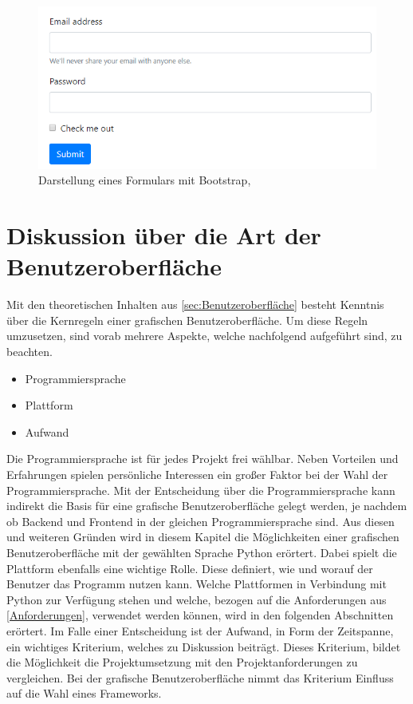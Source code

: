 \documentclass[a4paper,titlepage,halfparskip,12pt]{scrreprt}
\begin{document}
\begin{onehalfspacing}
\begin{figure}[h]
	\centering
	\includegraphics[scale=1.0]{images/BootstrapForm}
	\caption{Darstellung eines Formulars mit Bootstrap, \cite{bootstrapOnline}} 
	\label{img:BootstrapForm}
\end{figure}
\pagebreak

\chapter{Diskussion über die Art der Benutzeroberfläche}
\label{chap:DiskussionGUI}

Mit den theoretischen Inhalten aus \autoref{sec:Benutzeroberfläche} besteht Kenntnis über die Kernregeln einer grafischen Benutzeroberfläche. Um diese Regeln umzusetzen, sind vorab mehrere Aspekte, welche nachfolgend aufgeführt sind, zu beachten.
\begin{itemize}
	\item Programmiersprache
	\item Plattform
	\item Aufwand
\end{itemize}
Die Programmiersprache ist für jedes Projekt frei wählbar. Neben Vorteilen und Erfahrungen spielen persönliche Interessen ein großer Faktor bei der Wahl der Programmiersprache. Mit der Entscheidung über die Programmiersprache kann indirekt die Basis für eine grafische Benutzeroberfläche gelegt werden, je nachdem ob Backend und Frontend in der gleichen Programmiersprache sind. Aus diesen und weiteren Gründen wird in diesem Kapitel die Möglichkeiten einer grafischen Benutzeroberfläche mit der gewählten Sprache Python erörtert. Dabei spielt die Plattform ebenfalls eine wichtige Rolle. Diese definiert, wie und worauf der Benutzer das Programm nutzen kann. Welche Plattformen in Verbindung mit Python zur Verfügung stehen und welche, bezogen auf die Anforderungen aus \autoref{Anforderungen}, verwendet werden können, wird in den folgenden Abschnitten erörtert. Im Falle einer Entscheidung ist der Aufwand, in Form der Zeitspanne, ein wichtiges Kriterium, welches zu Diskussion beiträgt. Dieses Kriterium, bildet die Möglichkeit die Projektumsetzung mit den Projektanforderungen zu vergleichen. Bei der grafische Benutzeroberfläche nimmt das Kriterium Einfluss auf die Wahl eines Frameworks.


\end{onehalfspacing}
\end{document}
